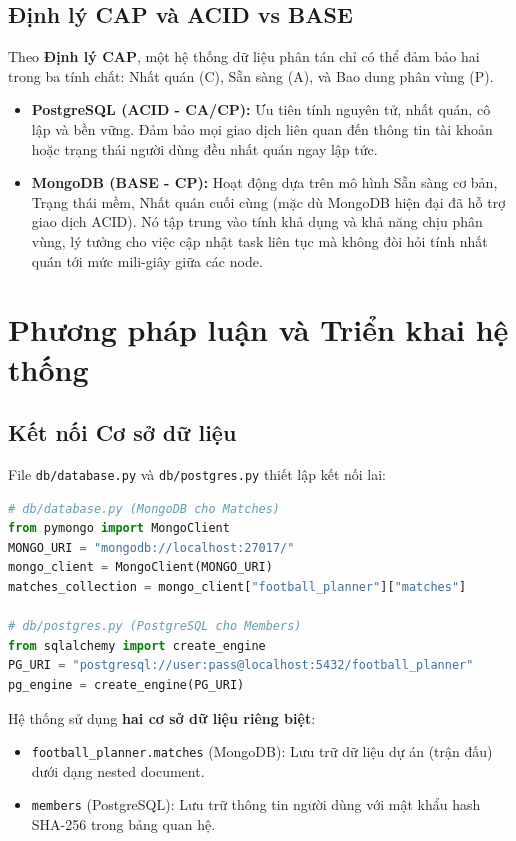 \documentclass[a4paper,12pt]{article}
\begin{document}
\subsection{Định lý CAP và ACID vs BASE}
Theo \textbf{Định lý CAP}, một hệ thống dữ liệu phân tán chỉ có thể đảm bảo hai trong ba tính chất: Nhất quán (C), Sẵn sàng (A), và Bao dung phân vùng (P).
\begin{itemize}
    \item \textbf{PostgreSQL (ACID - CA/CP):} Ưu tiên tính nguyên tử, nhất quán, cô lập và bền vững. Đảm bảo mọi giao dịch liên quan đến thông tin tài khoản hoặc trạng thái người dùng đều nhất quán ngay lập tức.
    \item \textbf{MongoDB (BASE - CP):} Hoạt động dựa trên mô hình Sẵn sàng cơ bản, Trạng thái mềm, Nhất quán cuối cùng (mặc dù MongoDB hiện đại đã hỗ trợ giao dịch ACID). Nó tập trung vào tính khả dụng và khả năng chịu phân vùng, lý tưởng cho việc cập nhật task liên tục mà không đòi hỏi tính nhất quán tới mức mili-giây giữa các node.
\end{itemize}

\section{Phương pháp luận và Triển khai hệ thống}

\subsection{Kết nối Cơ sở dữ liệu}

File \texttt{db/database.py} và \texttt{db/postgres.py} thiết lập kết nối lai:

\begin{lstlisting}[language=Python, caption=Thiết lập Kết nối Lai (Hybrid)]
# db/database.py (MongoDB cho Matches)
from pymongo import MongoClient
MONGO_URI = "mongodb://localhost:27017/"
mongo_client = MongoClient(MONGO_URI)
matches_collection = mongo_client["football_planner"]["matches"]

# db/postgres.py (PostgreSQL cho Members)
from sqlalchemy import create_engine
PG_URI = "postgresql://user:pass@localhost:5432/football_planner"
pg_engine = create_engine(PG_URI)
\end{lstlisting}

Hệ thống sử dụng \textbf{hai cơ sở dữ liệu riêng biệt}:
\begin{itemize}
    \item \texttt{football\_planner.matches} (MongoDB): Lưu trữ dữ liệu dự án (trận đấu) dưới dạng nested document.
    \item \texttt{members} (PostgreSQL): Lưu trữ thông tin người dùng với mật khẩu hash SHA-256 trong bảng quan hệ.
\end{itemize}
\end{document}
